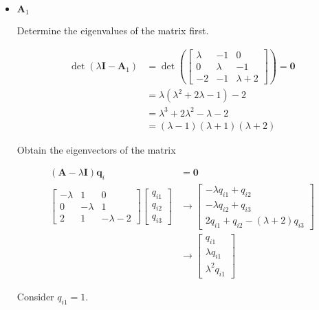 \begin{itemize}
 \item $\mathbf{A}_1$

 Determine the eigenvalues of the matrix first.

  \begin{align*}
  \det(\lambda \mathbf{I} - \mathbf{A}_1) &=
  \det(\begin{bmatrix}
       \lambda & -1 & 0 \\
       0 & \lambda & -1 \\
       -2 & -1 & \lambda+2
      \end{bmatrix})=\mathbf{0}\\
      &= \lambda (\lambda^2 +2\lambda -1) -2\\
      &= \lambda^3 +2\lambda^2 - \lambda -2\\
      &= (\lambda -1) (\lambda +1) (\lambda +2)
 \end{align*}

 Obtain the eigenvectors of the matrix

 \begin{align*}
(\mathbf{A} - \lambda \mathbf{I}) \mathbf{q}_i &= \mathbf{0}\\
\begin{bmatrix}
 -\lambda & 1 & 0\\
 0 & -\lambda & 1\\
 2 & 1 & - \lambda -2
\end{bmatrix}
\begin{bmatrix}
 q_{i1} \\q_{i2} \\q_{i3}
\end{bmatrix}
& \rightarrow
\begin{bmatrix}
 -\lambda q_{i1} + q_{i2}\\
 -\lambda q_{i2} + q_{i3}\\
 2 q_{i1} + q_{i2} - (\lambda +2) q_{i3}
\end{bmatrix}
\\
&\rightarrow \begin{bmatrix}
                          q_{i1}\\ \lambda q_{i1} \\ \lambda^2 q_{i1}
                         \end{bmatrix}
\end{align*}

Consider $q_{i1} = 1$.


\end{itemize}
